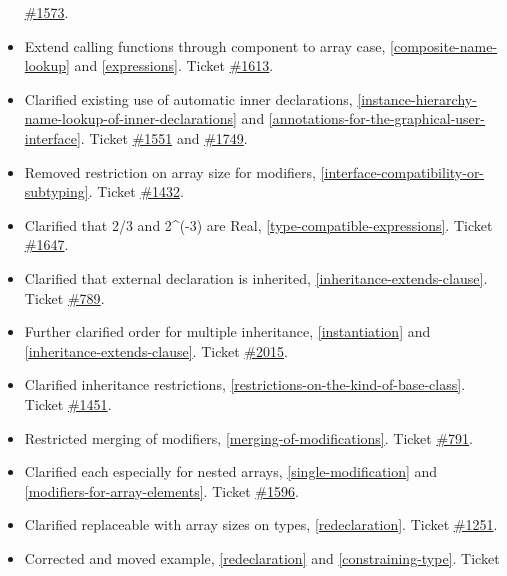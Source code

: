 \begin{itemize}
  \href{https://github.com/modelica/ModelicaSpecification/issues/1573}{\#1573}.
\item
  Extend calling functions through component to array case, \autoref{composite-name-lookup} and \autoref{expressions}. Ticket
  \href{https://github.com/modelica/ModelicaSpecification/issues/1613}{\#1613}.
\item
  Clarified existing use of automatic inner declarations, \autoref{instance-hierarchy-name-lookup-of-inner-declarations}
  and \autoref{annotations-for-the-graphical-user-interface}. Ticket
  \href{https://github.com/modelica/ModelicaSpecification/issues/1551}{\#1551} and
  \href{https://github.com/modelica/ModelicaSpecification/issues/1749}{\#1749}.
\item
  Removed restriction on array size for modifiers, \autoref{interface-compatibility-or-subtyping}. Ticket
  \href{https://github.com/modelica/ModelicaSpecification/issues/1432}{\#1432}.
\item
  Clarified that 2/3 and 2\^{}(-3) are Real, \autoref{type-compatible-expressions}. Ticket
  \href{https://github.com/modelica/ModelicaSpecification/issues/1647}{\#1647}.
\item
  Clarified that external declaration is inherited, \autoref{inheritance-extends-clause}. Ticket
  \href{https://github.com/modelica/ModelicaSpecification/issues/789}{\#789}.
\item
  Further clarified order for multiple inheritance, \autoref{instantiation} and
  \autoref{inheritance-extends-clause}. Ticket
  \href{https://github.com/modelica/ModelicaSpecification/issues/2015}{\#2015}.
\item
  Clarified inheritance restrictions, \autoref{restrictions-on-the-kind-of-base-class}. Ticket
  \href{https://github.com/modelica/ModelicaSpecification/issues/1451}{\#1451}.
\item
  Restricted merging of modifiers, \autoref{merging-of-modifications}. Ticket
  \href{https://github.com/modelica/ModelicaSpecification/issues/791}{\#791}.
\item
  Clarified each especially for nested arrays, \autoref{single-modification} and \autoref{modifiers-for-array-elements}.
  Ticket \href{https://github.com/modelica/ModelicaSpecification/issues/1596}{\#1596}.
\item
  Clarified replaceable with array sizes on types, \autoref{redeclaration}. Ticket
  \href{https://github.com/modelica/ModelicaSpecification/issues/1251}{\#1251}.
\item
  Corrected and moved example, \autoref{redeclaration} and \autoref{constraining-type}. Ticket

\end{itemize}
